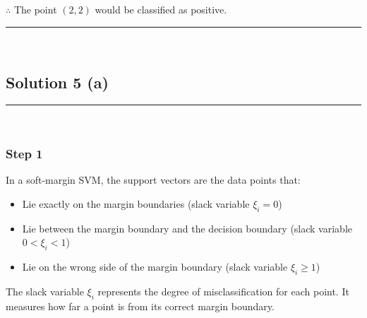\documentclass{article}
\begin{document}
\begin{center}
\end{center}

\subsubsection*{\normalfont}{$\therefore$ The point $(2, 2)$ would be classified as positive.}

\noindent\rule{\textwidth}{0.4pt}\\

\newpage

\subsection*{Solution 5 (a)}
\noindent\rule{\textwidth}{0.4pt}\\

\subsubsection*{Step 1}
\parbox{\textwidth}{
In a soft-margin SVM, the support vectors are the data points that:
\begin{itemize}
    \item Lie exactly on the margin boundaries (slack variable $\xi_i = 0$)
    \item Lie between the margin boundary and the decision boundary (slack variable $0 < \xi_i < 1$)
    \item Lie on the wrong side of the margin boundary (slack variable $\xi_i \geq 1$)
\end{itemize}

The slack variable $\xi_i$ represents the degree of misclassification for each point. It measures how far a point is from its correct margin boundary.
}
\end{document}
